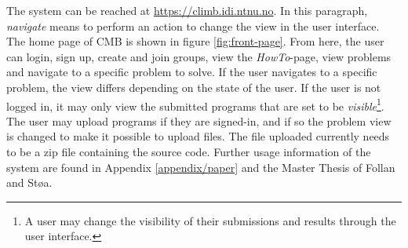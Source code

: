 The system can be reached at \url{https://climb.idi.ntnu.no}. In this paragraph, \textit{navigate} means to perform an action to change the view in the user interface. The home page of CMB is shown in figure \ref{fig:front-page}. From here, the user can login, sign up, create and join groups, view the \textit{HowTo}-page, view problems and navigate to a specific problem to solve. If the user navigates to a specific problem, the view differs depending on the state of the user. If the user is not logged in, it may only view the submitted programs that are set to be \textit{visible}\footnote{A user may change the visibility of their submissions and results through the user interface.}. The user may upload programs if they are signed-in, and if so the problem view is changed to make it possible to upload files. The file uploaded currently needs to be a zip file containing the source code. Further usage information of the system are found in Appendix \ref{appendix/paper} and the Master Thesis of Follan and Støa. \\

